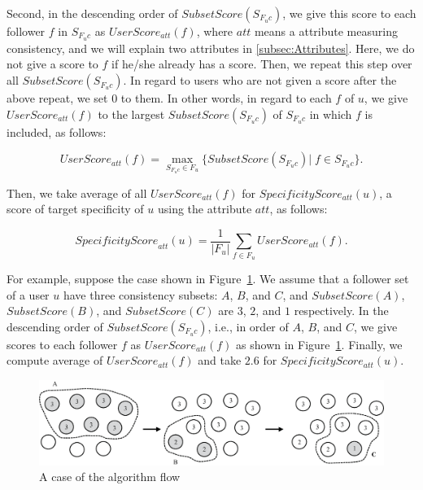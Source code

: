 Second, in the descending order of $\mathit{SubsetScore}(S_{F_uc})$, we give
this score to each follower $f$ in $S_{F_uc}$ as
$\mathit{UserScore}_{\mathit{att}}(f)$, where $\mathit{att}$ means a
attribute measuring consistency, and we will explain two attributes in
\ref{subsec:Attributes}. Here, we do not give a score to $f$ if
he/she already has a score. Then, we repeat this step over all
$\mathit{SubsetScore}(S_{F_uc})$.  In regard to users who are not given
a score after the above repeat, we set $0$ to them.  In other words, in
regard to each $f$ of $u$, we give
$\mathit{UserScore}_{\mathit{att}}(f)$ to the largest
$\mathit{SubsetScore}(S_{F_uc})$ of $S_{F_uc}$ in which $f$ is included,
as follows:

\vspace{-1ex}
\[
 \mathit{UserScore}_{\mathit{att}}(f) = \max_{S_{F_uc} \in F_u}
 \{\mathit{SubsetScore}(S_{F_uc})|\;f \in S_{F_uc}\}.
\]
\vspace{-2ex}

Then, we take average of all $\mathit{UserScore_{\mathit{att}}(f)}$ for
$\mathit{SpecificityScore_{\mathit{att}}(u)}$, a score of target
specificity of $u$ using the attribute $\mathit{att}$, as follows:

\vspace{-1ex}
\[
 \mathit{SpecificityScore}_{\mathit{att}}(u) = \frac{1}{|F_u|}
 \sum_{f \in F_u} \mathit{UserScore}_{\mathit{att}}(f).
\]
\vspace{-2ex}

For example, suppose the case shown in Figure~\ref{fig:Algorithm}.
We assume that a follower set of a user $u$ have three consistency
subsets: $A$, $B$, and $C$, and $\mathit{SubsetScore}(A)$,
$\mathit{SubsetScore}(B)$, and $\mathit{SubsetScore}(C)$ are $3$, $2$,
and $1$ respectively.  In the descending order of
$\mathit{SubsetScore}(S_{F_uc})$, i.e., in order of $A$, $B$, and $C$,
we give scores to each follower $f$ as
$\mathit{UserScore}_{\mathit{att}}(f)$ as shown in
Figure~\ref{fig:Algorithm}.  Finally, we compute average of
$\mathit{UserScore}_{\mathit{att}}(f)$ and take $2.6$ for
$\mathit{SpecificityScore_{\mathit{att}}(u)}$.

{\footnotesize
\begin{figure}[t]
\begin{center}
\includegraphics[width=14cm]{images/algorithm.eps}
 \caption{A case of the algorithm flow}
\label{fig:Algorithm}
\end{center}
\end{figure}
}

